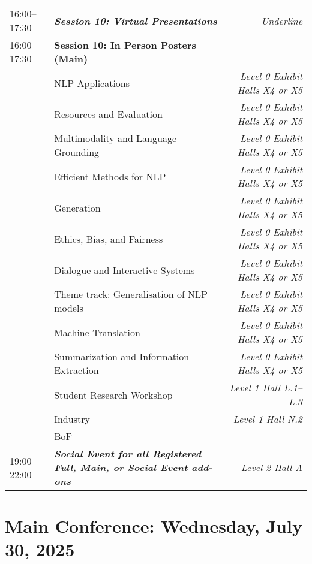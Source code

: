 \begin{xltabular}{\linewidth}{l X r}
    16:00--17:30    &   \textit{\textbf{Session 10: Virtual Presentations}}    & \textit{Underline}  \\
    16:00--17:30    &   \textbf{Session 10: In Person Posters (Main)} & \\
    &   NLP Applications  & \textit{Level 0 Exhibit Halls X4 or X5} \\
    &   Resources and Evaluation  & \textit{Level 0 Exhibit Halls X4 or X5} \\
    &   Multimodality and Language Grounding  & \textit{Level 0 Exhibit Halls X4 or X5} \\
    &   Efficient Methods for NLP  & \textit{Level 0 Exhibit Halls X4 or X5} \\
    &   Generation    & \textit{Level 0 Exhibit Halls X4 or X5} \\
    &   Ethics, Bias, and Fairness  & \textit{Level 0 Exhibit Halls X4 or X5} \\
    &   Dialogue and Interactive Systems  & \textit{Level 0 Exhibit Halls X4 or X5} \\
    &   Theme track: Generalisation of NLP models  & \textit{Level 0 Exhibit Halls X4 or X5} \\
    &   Machine Translation  & \textit{Level 0 Exhibit Halls X4 or X5} \\
    &   Summarization and Information Extraction  & \textit{Level 0 Exhibit Halls X4 or X5} \\
    &   Student Research Workshop  & \textit{Level 1 Hall L.1--L.3} \\
    &   Industry  & \textit{Level 1 Hall N.2} \\
    &   BoF  &  \\

    19:00--22:00    &   \textit{\textbf{Social Event for all Registered Full, Main, or Social Event add-ons}}    &  \textit{Level 2 Hall A} \\


\end{xltabular}

\clearpage


\section{Main Conference: Wednesday, July 30, 2025}

